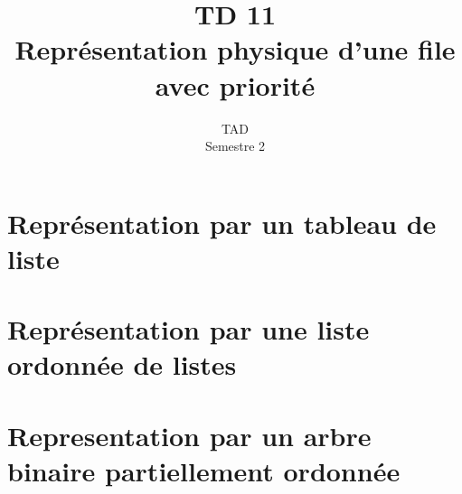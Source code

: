 \documentclass{article}
\title{TD 11\\ Représentation physique d'une file avec priorité}
\date{TAD\\ Semestre 2}
\begin{document}
	\maketitle
	\section{Représentation par un tableau de liste}
		\subsection{}
			
		\subsection{}
			
		\subsection{}
			
	\section{Représentation par une liste ordonnée de listes}
		\subsection{}
		
		\subsection{}
			
		\subsection{}
			
	\section{Representation par un arbre binaire partiellement ordonnée}		
		\subsection{}
		
\end{document}

